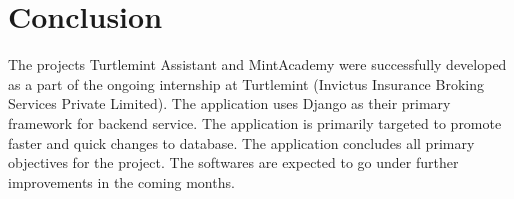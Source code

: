 \chapter{Conclusion}

The projects Turtlemint Assistant and MintAcademy were successfully developed
as a part of the ongoing internship at Turtlemint (Invictus Insurance Broking
Services Private Limited). The application uses Django as their primary
framework for backend service. The application is primarily targeted to
promote faster and quick changes to database. The application concludes all
primary objectives for the project. The softwares are expected to go under
further improvements in the coming months.
